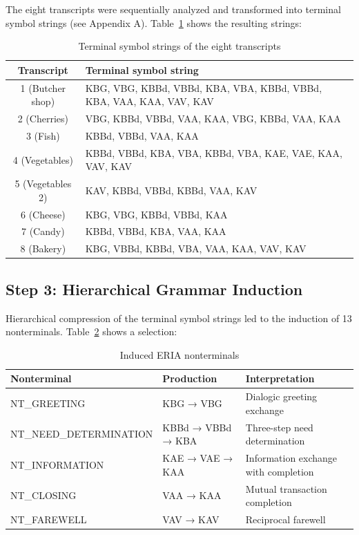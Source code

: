 \documentclass[12pt,a4paper]{article}
\begin{document}
The eight transcripts were sequentially analyzed and transformed into terminal symbol strings (see Appendix A). Table~\ref{tab:chains} shows the resulting strings:

\begin{table}[H]
\centering
\caption{Terminal symbol strings of the eight transcripts}
\label{tab:chains}
\begin{tabular}{@{} c l @{}}
\toprule
\textbf{Transcript} & \textbf{Terminal symbol string} \\
\midrule
1 (Butcher shop) & KBG, VBG, KBBd, VBBd, KBA, VBA, KBBd, VBBd, KBA, VAA, KAA, VAV, KAV \\
2 (Cherries) & VBG, KBBd, VBBd, VAA, KAA, VBG, KBBd, VAA, KAA \\
3 (Fish) & KBBd, VBBd, VAA, KAA \\
4 (Vegetables) & KBBd, VBBd, KBA, VBA, KBBd, VBA, KAE, VAE, KAA, VAV, KAV \\
5 (Vegetables 2) & KAV, KBBd, VBBd, KBBd, VAA, KAV \\
6 (Cheese) & KBG, VBG, KBBd, VBBd, KAA \\
7 (Candy) & KBBd, VBBd, KBA, VAA, KAA \\
8 (Bakery) & KBG, VBBd, KBBd, VBA, VAA, KAA, VAV, KAV \\
\bottomrule
\end{tabular}
\end{table}

\subsection{Step 3: Hierarchical Grammar Induction}

Hierarchical compression of the terminal symbol strings led to the induction of 13 nonterminals. Table~\ref{tab:nonterm} shows a selection:

\begin{table}[H]
\centering
\caption{Induced ERIA nonterminals}
\label{tab:nonterm}
\begin{tabular}{@{} l l l @{}}
\toprule
\textbf{Nonterminal} & \textbf{Production} & \textbf{Interpretation} \\
\midrule
NT\_GREETING & KBG → VBG & Dialogic greeting exchange \\
NT\_NEED\_DETERMINATION & KBBd → VBBd → KBA & Three-step need determination \\
NT\_INFORMATION & KAE → VAE → KAA & Information exchange with completion \\
NT\_CLOSING & VAA → KAA & Mutual transaction completion \\
NT\_FAREWELL & VAV → KAV & Reciprocal farewell \\
\bottomrule
\end{tabular}
\end{table}
\end{document}
